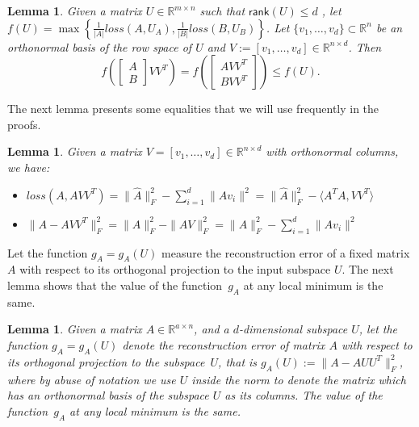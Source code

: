 \documentclass{article}
\newtheorem{lemma}[theorem]{Lemma}
\newcommand{\rank}{\mathsf{rank}}
\newcommand{\R}{\mathbb{R}}
\begin{document}
\begin{lemma}
\label{lem:A}
Given a matrix $U\in \mathbb{R}^{m\times n}$ such that
$\rank(U)\leq d$ , let
$f(U)=\max \left\{ \frac{1}{|A|} loss(A,U_A), \frac{1}{|B|} loss (B,
U_B)\right\}$. Let $\{v_1,\ldots, v_d\} \subset \R^n $ be an orthonormal
basis of the row space of $U$ and
$V := [v_1, \ldots , v_d] \in \mathbb{R}^{n \times d}$. Then
  $$
f\left(\left[ \begin{array}{c} A \\ B \end{array} \right] VV^T\right) = f\left(\left[ \begin{array}{c} AVV^T \\ BVV^T \end{array} \right]\right) \leq f(U).
  $$
\end{lemma}
The next lemma presents some equalities that we will use frequently in the proofs.
\begin{lemma}
\label{lem:B}
        Given a matrix $V=[v_1,\ldots, v_d]\in \mathbb{R}^{n\times d}$ with orthonormal columns, we have:
        \begin{itemize}
                \item[$\diamond$] $loss(A, AVV^T) = \|\widehat{A}\|_F^2 - \sum_{i=1}^{d} \|Av_i\|^2 = \|\widehat{A}\|_F^2 - \langle A^TA, VV^T\rangle$
                \item[$\diamond$] $\|A-AVV^T\|_F^2 =  \|A\|_F^2 - \|AV\|_F^2 = \|A\|_F^2 - \sum_{i=1}^d \|Av_i\|^2$
        \end{itemize}
\end{lemma}
Let the function $g_A=g_A(U)$ measure the reconstruction error of a fixed matrix $A$ with respect to its orthogonal projection to the input
subspace $U$. The next lemma shows that the value of the function~$g_A$ at any local minimum is the same.
\begin{lemma}
\label{lem:C}
Given a matrix $A\in \mathbb{R}^{a\times n}$, and a $d$-dimensional subspace $U$,
let the function $g_A=g_A(U)$ denote the reconstruction error of matrix
$A$ with respect to its orthogonal projection to the subspace~$U$, that is  $g_A(U) := \|A-AUU^T\|_F^2$, where by abuse of notation we use
$U$ inside the norm to denote the matrix which has an orthonormal
basis of the subspace $U$ as its columns.
The value of the function~$g_A$ at any local minimum is the same. 

\end{lemma}
\end{document}
